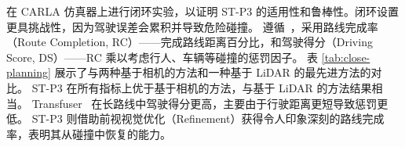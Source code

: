 \documentclass[runningheads]{llncs}
\begin{document}

在 CARLA 仿真器上进行闭环实验，以证明 ST-P3 的适用性和鲁棒性。闭环设置更具挑战性，因为驾驶误差会累积并导致危险碰撞。
%
遵循~\cite{prakash2021multi}，采用路线完成率（Route Completion, RC）——完成路线距离百分比，和驾驶得分（Driving Score, DS）——RC 乘以考虑行人、车辆等碰撞的惩罚因子。
%
表 \ref{tab:close-planning} 展示了与两种基于相机的方法和一种基于 LiDAR 的最先进方法的对比。
%
ST-P3 在所有指标上优于基于相机的方法，与基于 LiDAR 的方法结果相当。
%
%
Transfuser~\cite{prakash2021multi} 在长路线中驾驶得分更高，主要由于行驶距离更短导致惩罚更低。
%
%
ST-P3 则借助前视视觉优化（Refinement）获得令人印象深刻的路线完成率，表明其从碰撞中恢复的能力。
\end{document}
